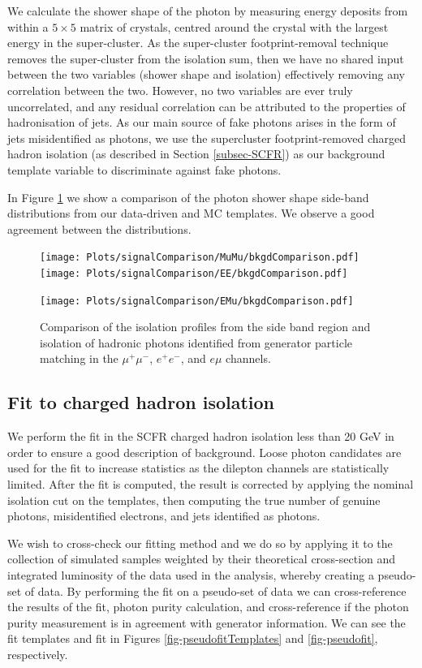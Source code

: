 We calculate the shower shape of the photon by measuring energy deposits from within a $5 \times 5$ matrix of crystals, centred around the crystal with the largest energy in the super-cluster. As the super-cluster footprint-removal technique removes the super-cluster from the isolation sum, then we have no shared input between the two variables (shower shape and isolation) effectively removing any correlation between the two. However, no two variables are ever truly uncorrelated, and any residual correlation can be attributed to the properties of hadronisation of jets. As our main source of fake photons arises in the form of jets misidentified as photons, we use the supercluster footprint-removed charged hadron isolation (as described in Section \ref{subsec-SCFR}) as our background template variable to discriminate against fake photons.

In Figure \ref{fig-backgroundComparison} we show a comparison of the photon shower shape side-band distributions from our data-driven and MC templates. We observe a good agreement between the distributions.  


\begin{figure}
\texttt{[image: Plots/signalComparison/MuMu/bkgdComparison.pdf]}
\texttt{[image: Plots/signalComparison/EE/bkgdComparison.pdf]}
\begin{center}
\texttt{[image: Plots/signalComparison/EMu/bkgdComparison.pdf]}
\end{center}
\caption{Comparison of the isolation profiles from the side band region and isolation of hadronic photons identified from generator particle matching in the $\mu^{+}\mu^{-}$, $e^{+}e^{-}$, and $e\mu$ channels.}
\label{fig-backgroundComparison}
\end{figure}

\subsection{Fit to charged hadron isolation}

We perform the fit in the SCFR charged hadron isolation less than 20 GeV in order to ensure a good description of background. Loose photon candidates are used for the fit to increase statistics as the dilepton channels are statistically limited. After the fit is computed, the result is corrected by applying the nominal isolation cut on the templates, then computing the true number of genuine photons, misidentified electrons, and jets identified as photons. 

We wish to cross-check our fitting method and we do so by applying it to the collection of simulated samples weighted by their theoretical cross-section and integrated luminosity of the data used in the analysis, whereby creating a pseudo-set of data. By performing the fit on a pseudo-set of data we can cross-reference the results of the fit, photon purity calculation, and cross-reference if the photon purity measurement is in agreement with generator information. We can see the fit templates and fit in Figures \ref{fig-pseudofitTemplates} and \ref{fig-pseudofit}, respectively.


